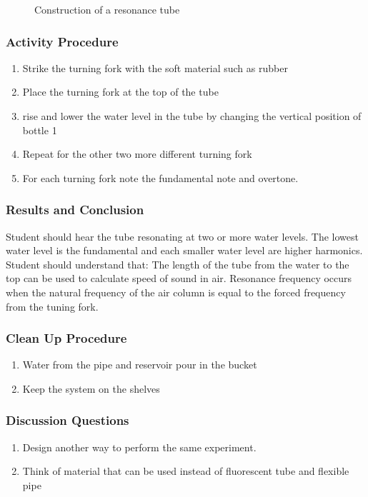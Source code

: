 \begin{figure}
\begin{center}
\def\svgwidth{200pt}

\caption{Construction of a resonance tube}
\label{fig:resonance-tube}
\end{center}
\end{figure}

\subsubsection*{Activity Procedure}
\begin{enumerate}
\item{Strike the turning fork with the soft material such as rubber}
\item{Place the turning fork at the top of the tube}
\item{rise and lower the water level in the tube by changing the vertical position of bottle 1}
\item{Repeat for the other two more different turning fork}
\item{For each turning fork note the fundamental note and overtone.} 
\end{enumerate}

\subsubsection*{Results and Conclusion}
Student should hear the tube resonating at two or more water levels. The lowest water level is the fundamental and each smaller water level are higher harmonics.  
Student should understand that: 
The length of the tube from the water to the top can be used to calculate speed of sound in air. 
Resonance frequency occurs when the natural frequency of the air column is equal to the forced frequency from the tuning fork.  

\subsubsection*{Clean Up Procedure}
\begin{enumerate}
\item{Water from the pipe and reservoir pour in the bucket}
\item{Keep the system on the shelves}
\end{enumerate}

\subsubsection*{Discussion Questions}
\begin{enumerate}
\item{Design another way to perform the same experiment.} 
\item{Think of material that can be used instead of fluorescent tube and flexible pipe}
\end{enumerate}

